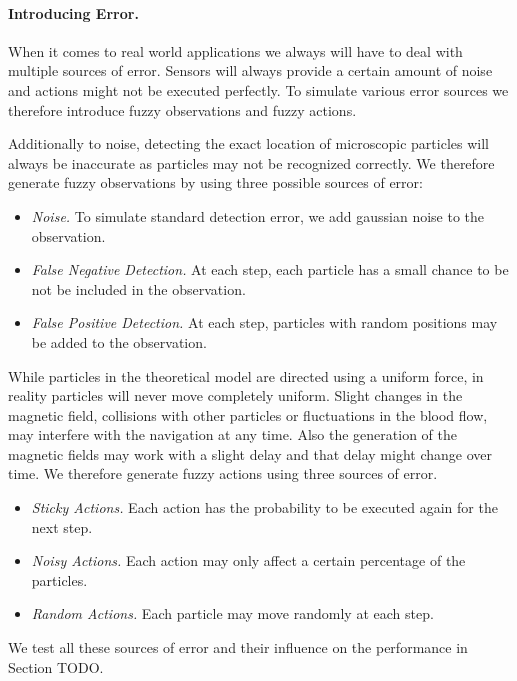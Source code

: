 \paragraph{Introducing Error.}
When it comes to real world applications we always will have to deal with multiple sources of error. Sensors will always provide a certain amount of noise and actions might not be executed perfectly. To simulate various error sources we therefore introduce fuzzy observations and fuzzy actions.  


Additionally to noise, detecting the exact location of microscopic particles will always be inaccurate as particles may not be recognized correctly. We therefore generate fuzzy observations by using three possible sources of error:

\begin{itemize}
    \item \textit{Noise.} To simulate standard detection error, we add gaussian noise to the observation.
    \item \textit{False Negative Detection.} At each step, each particle has a small chance to be not be included in the observation.
    \item \textit{False Positive Detection.} At each step, particles with random positions may be added to the observation.
\end{itemize}

While particles in the theoretical model are directed using a uniform force, in reality particles will never move completely uniform. Slight changes in the magnetic field, collisions with other particles or fluctuations in the blood flow, may interfere with the navigation at any time. Also the generation of the magnetic fields may work with a slight delay and that delay might change over time. We therefore generate fuzzy actions using three sources of error.

\begin{itemize}
    \item \textit{Sticky Actions.} Each action has the probability to be executed again for the next step.
    \item \textit{Noisy Actions.} Each action may only affect a certain percentage of the particles.
    \item \textit{Random Actions.} Each particle may move randomly at each step.
\end{itemize}

We test all these sources of error and their influence on the performance in Section TODO.


